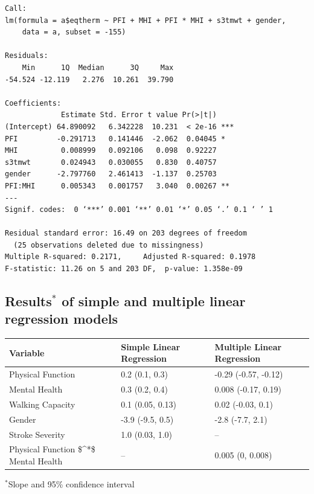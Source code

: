 \documentclass[
]{book}
\begin{document}
\begin{verbatim}
Call:
lm(formula = a$eqtherm ~ PFI + MHI + PFI * MHI + s3tmwt + gender, 
    data = a, subset = -155)

Residuals:
    Min      1Q  Median      3Q     Max 
-54.524 -12.119   2.276  10.261  39.790 

Coefficients:
             Estimate Std. Error t value Pr(>|t|)    
(Intercept) 64.890092   6.342228  10.231  < 2e-16 ***
PFI         -0.291713   0.141446  -2.062  0.04045 *  
MHI          0.008999   0.092106   0.098  0.92227    
s3tmwt       0.024943   0.030055   0.830  0.40757    
gender      -2.797760   2.461413  -1.137  0.25703    
PFI:MHI      0.005343   0.001757   3.040  0.00267 ** 
---
Signif. codes:  0 ‘***’ 0.001 ‘**’ 0.01 ‘*’ 0.05 ‘.’ 0.1 ‘ ’ 1 

Residual standard error: 16.49 on 203 degrees of freedom
  (25 observations deleted due to missingness)
Multiple R-squared: 0.2171,     Adjusted R-squared: 0.1978 
F-statistic: 11.26 on 5 and 203 DF,  p-value: 1.358e-09 
\end{verbatim}

\hypertarget{results-of-simple-and-multiple-linear-regression-models}{%
\subsection{\texorpdfstring{Results\(^*\) of simple and multiple linear regression models}{Results\^{}* of simple and multiple linear regression models}}\label{results-of-simple-and-multiple-linear-regression-models}}

\begin{tabular}{l|l|l}
\hline
Variable & Simple Linear Regression & Multiple Linear Regression\\
\hline
Physical Function & 0.2 (0.1, 0.3) & -0.29 (-0.57, -0.12)\\
\hline
Mental Health & 0.3 (0.2, 0.4) & 0.008 (-0.17, 0.19)\\
\hline
Walking Capacity & 0.1 (0.05, 0.13) & 0.02 (-0.03, 0.1)\\
\hline
Gender & -3.9 (-9.5, 0.5) & -2.8 (-7.7, 2.1)\\
\hline
Stroke Severity & 1.0 (0.03, 1.0) & --\\
\hline
Physical Function \$\textasciicircum{}*\$ Mental Health & -- & 0.005 (0, 0.008)\\
\hline
\end{tabular}

\(^*\)Slope and 95\% confidence interval
\end{document}

